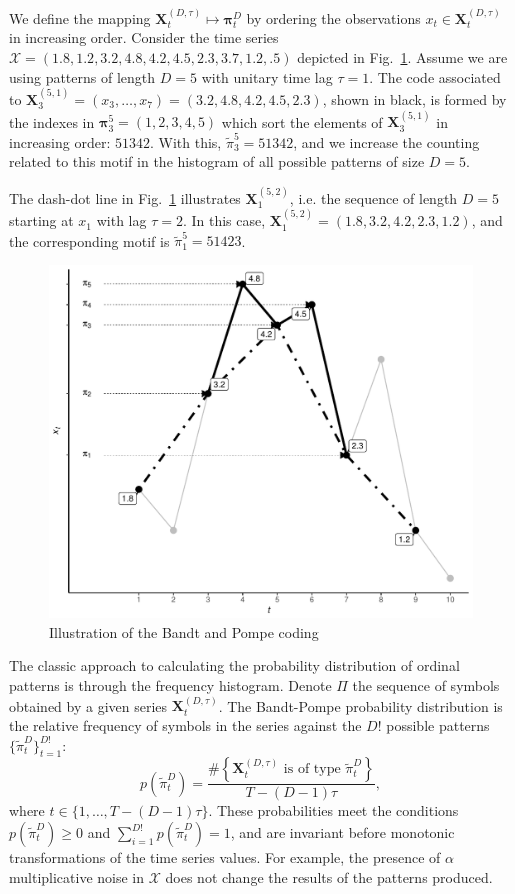 \documentclass[journal]{IEEEtran}
\begin{document}
We define the mapping ${\mathbf X}_t^{(D,\tau)} \mapsto {\mathbf \pi}_t^{D}$ by ordering the observations $x_t \in {\mathbf X}_t^{(D,\tau)}$ in increasing order.
Consider the time series $\mathcal X = (1.8, 1.2, 3.2, 4.8, 4.2, 4.5, 2.3, 3.7, 1.2, .5)$ depicted in Fig.~\ref{Fig:IntroBP}.
Assume we are using patterns of length $D=5$ with unitary time lag $\tau=1$.
The code associated to $\mathbf X_{3}^{(5,1)}=(x_3,\dots,x_7)=(3.2, 4.8, 4.2, 4.5, 2.3)$, shown in black, is formed by the indexes in $\bm\pi_3^{5}=(1,2,3,4,5)$ which sort the elements of $\mathbf X_{3}^{(5,1)}$ in increasing order: $51342$.
With this, $\widetilde{\pi}_3^{5} = 51342$, and we increase the counting related to this motif in the histogram of all possible patterns of size $D=5$.

The dash-dot line in Fig.~\ref{Fig:IntroBP} illustrates $\mathbf X_{1}^{(5,2)}$, i.e. the sequence of length $D=5$ starting at $x_1$ with lag $\tau=2$.
In this case, $\mathbf X_{1}^{(5,2)}= (1.8, 3.2, 4.2, 2.3, 1.2)$, and the corresponding motif is $\widetilde{\pi}_1^{5}=51423$.

\begin{figure}%
	\centering
	\includegraphics[width=.9\linewidth]{Figures/IntroBP.pdf}
	\caption{Illustration of the Bandt and Pompe coding\label{Fig:IntroBP}}
\end{figure}

The classic approach to calculating the probability distribution of ordinal patterns is through the frequency histogram.
Denote $\Pi$ the sequence of symbols obtained by a given series $\mathbf{X}_t^{(D,\tau)}$.
The Bandt-Pompe probability distribution is the relative frequency of symbols in the series against the $D!$ possible patterns $\{\widetilde\pi_t^D \}_{t = 1}^{D!}$:
\begin{equation}
p(\widetilde\pi_t^D) = \frac{\#\left \{\mathbf{X}_t^{(D,\tau)} \text{ is of type } \widetilde\pi_t^D\right \}}{T- (D-1)\tau},  
\end{equation}
where  $t\in \{1, \dots, T-(D-1)\tau\}$.
These probabilities meet the conditions $p(\widetilde\pi_t^D) \ge 0$ and  $\sum_{i=1}^{D!} p(\widetilde\pi_t^D) = 1$, and are invariant before monotonic transformations of the time series values.
For example, the presence of $\alpha$ multiplicative noise in ${\mathcal X}$ does not change the results of the patterns produced.
\end{document}
